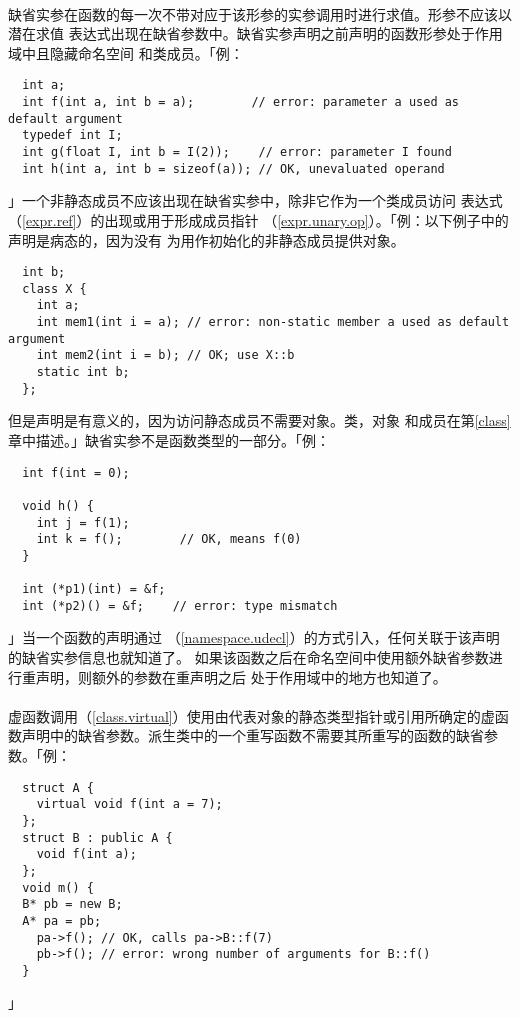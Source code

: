 \paragraph{}
缺省实参在函数的每一次不带对应于该形参的实参调用时进行求值。形参不应该以潜在求值
表达式出现在缺省参数中。缺省实参声明之前声明的函数形参处于作用域中且隐藏命名空间
和类成员。「例：
\begin{lstlisting}
  int a;
  int f(int a, int b = a);        // error: parameter a used as default argument
  typedef int I;
  int g(float I, int b = I(2));    // error: parameter I found
  int h(int a, int b = sizeof(a)); // OK, unevaluated operand
\end{lstlisting}」一个非静态成员不应该出现在缺省实参中，除非它作为一个类成员访问
表达式（\ref{expr.ref}）的出现或用于形成成员指针
（\ref{expr.unary.op}）。「例：以下例子中的声明是病态的，因为没有
为用作初始化的非静态成员提供对象。
\begin{lstlisting}
  int b;
  class X {
    int a;
    int mem1(int i = a); // error: non-static member a used as default argument
    int mem2(int i = b); // OK; use X::b
    static int b;
  };
\end{lstlisting}
但是声明是有意义的，因为访问静态成员不需要对象。类，对象
和成员在第\ref{class}章中描述。」缺省实参不是函数类型的一部分。「例：
\begin{lstlisting}
  int f(int = 0);

  void h() {
    int j = f(1);
    int k = f();        // OK, means f(0)
  }

  int (*p1)(int) = &f;
  int (*p2)() = &f;    // error: type mismatch
\end{lstlisting}」当一个函数的声明通过
（\ref{namespace.udecl}）的方式引入，任何关联于该声明的缺省实参信息也就知道了。
如果该函数之后在命名空间中使用额外缺省参数进行重声明，则额外的参数在重声明之后
处于作用域中的地方也知道了。

\paragraph{}
虚函数调用（\ref{class.virtual}）使用由代表对象的静态类型指针或引用所确定的虚函
数声明中的缺省参数。派生类中的一个重写函数不需要其所重写的函数的缺省参数。「例：
\begin{lstlisting}
  struct A {
    virtual void f(int a = 7);
  };
  struct B : public A {
    void f(int a);
  };
  void m() {
  B* pb = new B;
  A* pa = pb;
    pa->f(); // OK, calls pa->B::f(7)
    pb->f(); // error: wrong number of arguments for B::f()
  }
\end{lstlisting}」

